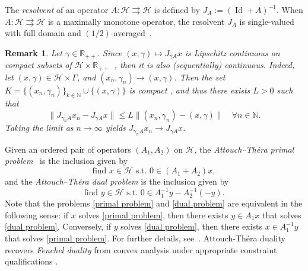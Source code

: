 \documentclass[a4paper,12pt]{article}
\newtheorem{remark}[theorem]{Remark}
\DeclareMathOperator{\Id}{Id}
\newcommand{\setto}{\rightrightarrows}
\begin{document}
 
 The \emph{resolvent} of an operator $A:\mathcal{H}\setto\mathcal{H}$ is defined by $J_{A}:=(\Id+A)^{-1}$. When $A:\mathcal{H}\setto\mathcal{H}$ is a maximally monotone operator, the resolvent $J_{A}$ is single-valued with full domain and $(1/2)$-averaged~\cite[Corollary~23.11]{bauschke2017convex}. 

\begin{remark}\label{remark: Lipschitz continuity in resolvent}
    Let $\gamma\in\mathbb{R}_{++}$. Since $(x,\gamma) \mapsto J_{\gamma A}x$ is Lipschitz continuous on compact subsets of $\mathcal{H} \times \mathbb{R}_{++}$~\cite[Proposition~3.4]{atenas2025relocated}, then it is also (sequentially) continuous. Indeed, let $(x,\gamma) \in \mathcal{H} \times \Gamma$, and $(x_n, \gamma_n) \to (x,\gamma)$. Then the set $K = \{(x_n,\gamma_n)\}_{k \in \mathbb{N}} \cup \{(x,\gamma)\}$ is compact \cite[Theorem 2.38]{aliprantis2006infinite}, and thus there exists $L >0$ such that \begin{equation*}
    \| J_{\gamma_n A}x_n - J_{\gamma A} x\| \leq L \|(x_n,\gamma_n) - (x,\gamma)\| \quad \forall n \in \mathbb{N}.
\end{equation*} Taking the limit as $n \to \infty$ yields $J_{\gamma_n A}x_n \to J_{\gamma A} x$. 
\end{remark}
 Given an ordered pair of operators $(A_1,A_2)$ on $\mathcal{H}$, the \emph{Attouch--Th\'era primal problem}~\cite{attouch1996general} is the inclusion given by
    \begin{equation}\label{primal problem}
        \text{find~}x\in\mathcal{H}\text{~s.t.~}0\in (A_1+A_2)x,
    \end{equation}
and the \emph{Attouch--Th\'era dual problem} is the inclusion given by
    \begin{equation}\label{dual problem}
        \text{find~}y\in\mathcal{H}\text{~s.t.~}0\in A_1^{-1}y-A_2^{-1}(-y).
    \end{equation}
Note that the problems \eqref{primal problem} and \eqref{dual problem} are equivalent in the following sense: if $x$ solves \eqref{primal problem}, then there exists $y\in A_1x$ that solves \eqref{dual problem}. Conversely, if $y$ solves \eqref{dual problem}, then there exists $x\in A_1^{-1}y$ that solves \eqref{primal problem}. For further details, see~\cite[Corollary 3.2]{attouch1996general}. Attouch-Th{\'e}ra duality recovers \emph{Fenchel duality} from convex analysis under appropriate constraint qualifications \cite[Theorem~4.2]{attouch1996general}. 
\end{document}
